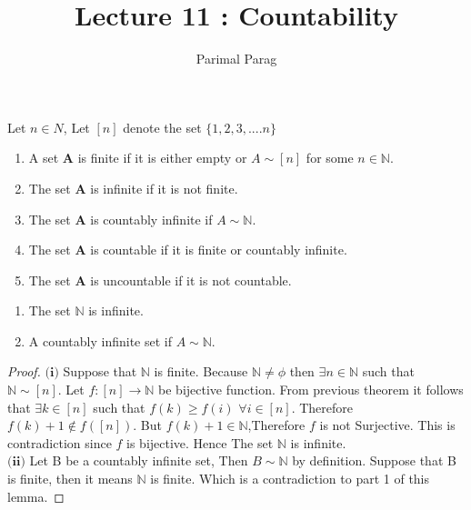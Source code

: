 \documentclass[a4paper,english,12pt]{article}   	%
\title{Lecture 11 : Countability}
\author{Parimal Parag}
\date{}							%
\begin{document}
\maketitle
\section{}
\begin{defn}[] Let $n \in N$, Let $[n]$ denote the set $\{1,2,3,....n\}$
\begin{enumerate}
\item A set $\textbf{A}$ is finite if it is either empty or $A \sim [n]$ for some $n \in \mathbb{N}$.
\item The set $\textbf{A}$ is infinite if it is not finite.
\item The set $\textbf{A}$ is countably infinite if $A \sim \mathbb{N}$.
\item The set $\textbf{A}$ is countable if it is finite or countably infinite.
\item The set $\textbf{A}$ is uncountable if it is not countable.
\end{enumerate}
\end{defn}
\begin{lem} 
\begin{enumerate}
\item The set $\mathbb{N}$ is infinite.
\item A countably infinite set if $A \sim \mathbb{N}$.
\end{enumerate}
\end{lem}
\begin{proof} $\textbf{(i)}$ Suppose that $\mathbb{N}$ is finite. Because $\mathbb{N} \neq \phi$ then $\exists n \in \mathbb{N}$ such that $\mathbb{N} \sim [n]$.
Let $f \colon [n] \to \mathbb{N}$ be bijective function. From previous theorem it follows that $\exists k \in [n]$ such that $f(k) \geq f(i) $ $\forall i \in [n]$. Therefore 
$f(k)+1 \notin f([n])$. But $f(k)+1 \in \mathbb{N}$,Therefore $f$ is not Surjective. This is contradiction since $f$ is bijective. Hence The set $\mathbb{N}$ is infinite.\\
$\textbf{(ii)}$ Let B be a countably infinite set, Then $B \sim \mathbb{N}$ by definition. Suppose that B is finite, then it means  $\mathbb{N}$ is finite. Which is a contradiction to part 1 of this lemma.
\end{proof} 
\end{document}
